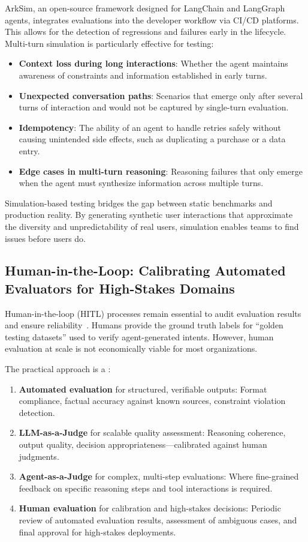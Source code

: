 ArkSim, an open-source framework designed for LangChain and LangGraph agents, integrates evaluations into the developer workflow via CI/CD platforms. This allows for the detection of regressions and failures early in the lifecycle. Multi-turn simulation is particularly effective for testing:

\begin{itemize}
    \item \textbf{Context loss during long interactions}: Whether the agent maintains awareness of constraints and information established in early turns.
    \item \textbf{Unexpected conversation paths}: Scenarios that emerge only after several turns of interaction and would not be captured by single-turn evaluation.
    \item \textbf{Idempotency}: The ability of an agent to handle retries safely without causing unintended side effects, such as duplicating a purchase or a data entry.
    \item \textbf{Edge cases in multi-turn reasoning}: Reasoning failures that only emerge when the agent must synthesize information across multiple turns.
\end{itemize}

Simulation-based testing bridges the gap between static benchmarks and production reality. By generating synthetic user interactions that approximate the diversity and unpredictability of real users, simulation enables teams to find issues before users do.

\subsection{Human-in-the-Loop: Calibrating Automated Evaluators for High-Stakes Domains}

Human-in-the-loop (HITL) processes remain essential to audit evaluation results and ensure reliability~\citep{production_ready_agentic}. Humans provide the ground truth labels for ``golden testing datasets'' used to verify agent-generated intents. However, human evaluation at scale is not economically viable for most organizations.

The practical approach is a :

\begin{enumerate}
    \item \textbf{Automated evaluation} for structured, verifiable outputs: Format compliance, factual accuracy against known sources, constraint violation detection.
    \item \textbf{LLM-as-a-Judge} for scalable quality assessment: Reasoning coherence, output quality, decision appropriateness---calibrated against human judgments.
    \item \textbf{Agent-as-a-Judge} for complex, multi-step evaluations: Where fine-grained feedback on specific reasoning steps and tool interactions is required.
    \item \textbf{Human evaluation} for calibration and high-stakes decisions: Periodic review of automated evaluation results, assessment of ambiguous cases, and final approval for high-stakes deployments.
\end{enumerate}


